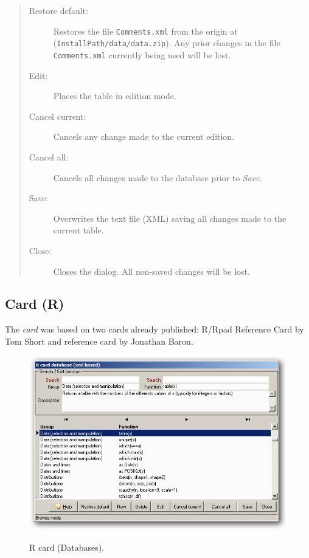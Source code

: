 \begin{quote}
  \begin{footnotesize}
    \begin{description}
      \item[Restore default:]
        Restores the file \texttt{Comments.xml} from the origin at
        (\texttt{InstallPath/data/data.zip}). Any prior changes in the
        file \texttt{Comments.xml} currently being used will be lost.
      \item[Edit:]
        Places the table in edition mode.
      \item[Cancel current:]
        Cancels any change made to the current edition.
      \item[Cancel all:]
        Cancels all changes made to the database prior to \textit{Save}.
      \item[Save:]
        Overwrites the text file (XML) saving all changes made to the current table.
      \item[Close:]
        Closes the dialog. All non-saved changes will be lost.
    \end{description}
  \end{footnotesize}
\end{quote}


\subsection{Card (R)}

The \textit{card} was based on two \RR{} cards already published:
R/Rpad Reference Card by Tom Short and \RR{} reference card by Jonathan Baron.

\begin{figure}[h!]
  \includegraphics[scale=0.35]{./res/rcard_dlg.png}\\
  \caption{R card (Databases).}
  \label{fig:rcard_dlg}
\end{figure}

